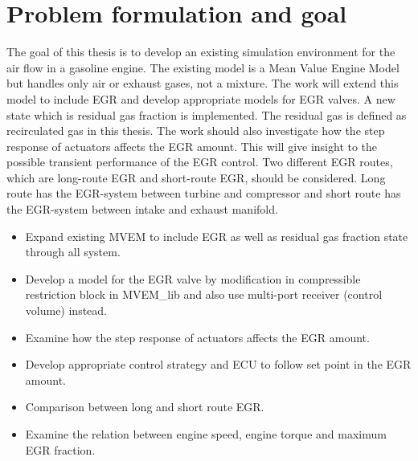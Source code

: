 


\section{Problem formulation and goal}
The goal of this thesis is to develop an existing simulation environment for the air flow in a gasoline engine. The existing model is a Mean Value Engine Model but handles only air or exhaust gases, not a mixture. The work will extend this model to include EGR and develop appropriate models for EGR valves. A new state which is residual gas fraction is implemented. The residual gas is defined as recirculated gas in this thesis. The work should also investigate how the step response of actuators affects the EGR amount. This will give insight to the possible transient performance of the EGR control. Two different EGR routes, which are long-route EGR and short-route EGR, should be considered. Long route has the EGR-system between turbine and compressor and short route has the EGR-system between intake and exhaust manifold.

\begin{itemize}
	\item Expand existing MVEM to include EGR as well as residual gas fraction state through all system.
	\item Develop a model for the EGR valve by modification in compressible restriction block in MVEM\_lib and also use multi-port receiver (control volume) instead.
	\item Examine how the step response of actuators affects the EGR amount. 
	\item Develop appropriate control strategy and ECU to follow set point in the EGR amount. 
	\item Comparison between long and short route EGR.
	\item Examine the relation between engine speed, engine torque and maximum EGR fraction.
\end{itemize}

